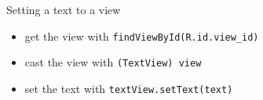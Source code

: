 \begin{frame}[fragile]{Setting a text to a view}
\begin{itemize}
  \item<+-> get the view with \lstinline`findViewById(R.id.view_id)`
  \item<+-> cast the view with \lstinline`(TextView) view`
  \item<+-> set the text with \lstinline`textView.setText(text)`
\end{itemize}
\end{frame}
